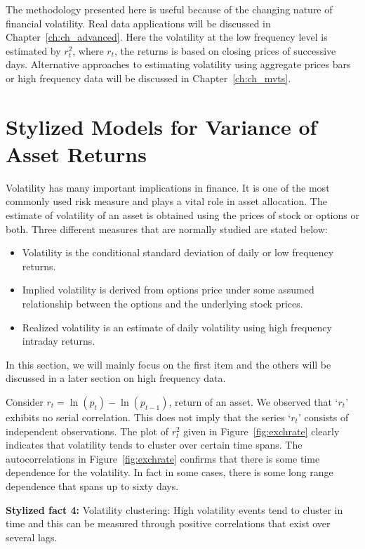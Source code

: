 The methodology presented here is useful because of the changing nature of financial volatility. Real data applications will be discussed in Chapter~\ref{ch:ch_advanced}. Here the volatility at the low frequency level is estimated by $r_t^2$, where $r_t$, the returns is based on closing prices of successive days. Alternative approaches to estimating volatility using aggregate prices bars or high frequency data will be discussed in Chapter~\ref{ch:ch_mvts}. 



\section{Stylized Models for Variance of Asset Returns \label{sec:sty_mod_var}}


Volatility has many important implications in finance. It is one of the most commonly used risk measure and plays a vital role in asset allocation. The estimate of volatility of an asset is obtained using the prices of stock or options or both. Three different measures that are normally studied are stated below:


\begin{itemize}
\item Volatility is the conditional standard deviation of daily or low frequency returns.
\item Implied volatility is derived from options price under some assumed relationship between the options and the underlying stock prices.
\item Realized volatility is an estimate of daily volatility using high frequency intraday returns.
\end{itemize}


In this section, we will mainly focus on the first item and the others will be discussed in a later section on high frequency data.


Consider $r_t = \ln{(p_t) - \ln{(p_{t-1})}}$, return of an asset. We observed that `$r_t$' exhibits no serial correlation. This does not imply that the series `$r_t$' consists of independent observations. The plot of $r_t^2$ given in Figure~\ref{fig:exchrate} clearly indicates that volatility tends to cluster over certain time spans. The autocorrelations in Figure~\ref{fig:exchrate} confirms that there is some time dependence for the volatility. In fact in some cases, there is some long range dependence that spans up to sixty days. \twomedskip


\noindent\textbf{Stylized fact 4:} Volatility clustering: High volatility events tend to cluster in time and this can be measured through positive correlations that exist over several lags.


